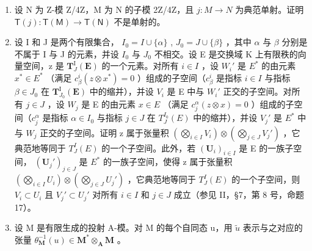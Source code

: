 \BourbakiExercisesSection

\begin{enumerate}
\def\labelenumi{\arabic{enumi}.}
\item
  设 N 为 Z-模 Z/4Z，M 为 N 的子模 2Z/4Z，且 \(j:M\to N\) 为典范单射。证明 \(\mathsf{T}(j):\mathsf{T}(\mathsf{M})\to\mathsf{T}(\mathsf{N})\) 不是单射的。
\item
  设 I 和 J 是两个有限集合， \(I_{0} = I \cup \{\alpha\}\) , \(J_{0} = J \cup \{\beta\}\) ，其中 \(\alpha\) 与 \(\beta\) 分别是不属于 I 与 J 的元素，并设 \(I_{0}\) 与 \(J_{0}\) 不相交。设 E 是交换域 K 上有限秩的向量空间，z 是 \(\mathbf{T}_{J}^{\mathrm{I}}(\mathbf{E})\) 的一个元素。对所有 \(i \in I\) ，设 \(W_{i}'\) 是 \(E^{*}\) 的由元素 \(x^{*} \in E^{*}\) （满足 \(c_{\beta}^{i}(z \otimes x^{*}) = 0\) ）组成的子空间（\(c_{\beta}^{i}\) 是指标 \(i \in I\) 与指标 \(\beta \in J_{0}\) 在 \(\mathbf{T}_{J_{0}}^{\mathrm{I}}(\mathbf{E})\) 中的缩并），并设 \(V_{i}\) 是 E 中与 \(W_{i}'\) 正交的子空间。对所有 \(j \in J\) ，设 \(W_{j}\) 是 E 的由元素 \(x \in E\) （满足 \(c_{j}^{\alpha}(z \otimes x) = 0\) ）组成的子空间（\(c_{j}^{\alpha}\) 是指标 \(\alpha \in I_{0}\) 与指标 \(j \in J\) 在 \(T_{J}^{I_{0}}(E)\) 中的缩并），并设 \(V_{j}'\) 是 \(E^{*}\) 中与 \(W_{j}\) 正交的子空间。证明 z 属于张量积 \(\left(\bigotimes_{i \in I} V_{i}\right) \otimes \left(\bigotimes_{j \in J} V_{j}'\right)\) ，它典范地等同于 \(T_{J}^{I}(E)\) 的一个子空间。此外，若 \((\mathbf{U}_{i})_{i \in I}\) 是 E 的一族子空间， \((\mathbf{U}_{j}')_{j \in J}\) 是 \(E^{*}\) 的一族子空间，使得 z 属于张量积 \(\left(\bigotimes_{i \in I} U_{i}\right) \otimes \left(\bigotimes_{j \in J} U_{j}'\right)\) ，它典范地等同于 \(T_{J}^{I}(E)\) 的一个子空间，则 \(V_{i} \subset U_{i}\) 且 \(V_{j}' \subset U_{j}'\) 对所有 \(i \in I\) 和 \(j \in J\) 成立（参见 II，§7，第 8 号，命题 17）。
\item
  设 M 是有限生成的投射 A-模。对 M 的每个自同态 u，用 \(\tilde{u}\) 表示与之对应的张量 \(\theta_{\mathbf{M}}^{-1}(u) \in \mathbf{M}^{*} \otimes_{\mathbf{A}} \mathbf{M}\) 。
\end{enumerate}

